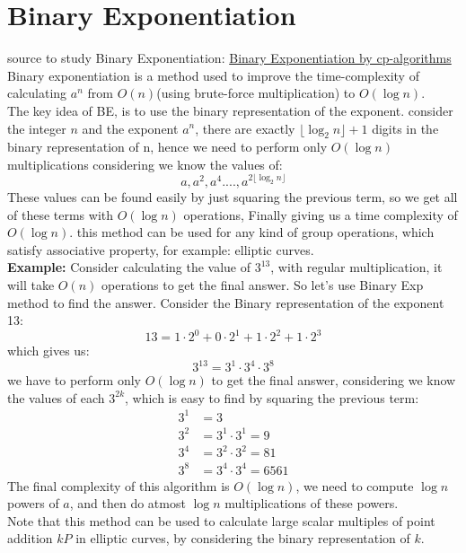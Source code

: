 \documentclass[12pt,a4paper]{report}
\begin{document}
\section{Binary Exponentiation}
source to study Binary Exponentiation: \href{https://cp-algorithms.com/algebra/binary-exp.html}{Binary Exponentiation by cp-algorithms}
\newline
\newline
Binary exponentiation is a method used to improve the time-complexity of calculating $a^n$ from $O(n)$(using brute-force multiplication) to $O(\log{n})$.\\
The key idea of BE, is to use the binary representation of the exponent.
consider the integer $n$ and the exponent $a^n$, there are exactly $\lfloor\log_2{n}\rfloor+1$ digits in the binary representation of n, hence we need to perform only $O(\log{n})$ multiplications considering we know the values of:
\[
a, a^2, a^4 ...., a^{2\lfloor\log_2{n}\rfloor}
\]
These values can be found easily by just squaring the previous term, so we get all of these terms with $O(\log{n})$ operations, Finally giving us a time complexity of $O(\log{n})$.
this method can be used for any kind of group operations, which satisfy associative property, for example: elliptic curves.\\
\textbf{Example: }Consider calculating the value of $3^{13}$, with regular multiplication, it will take $O(n)$ operations to get the final answer. So let's use Binary Exp method to find the answer. Consider the Binary representation of the exponent 13:
\[
13 = 1 \cdot 2^0 + 0 \cdot 2^1 + 1 \cdot 2^2 + 1 \cdot 2^3
\]
which gives us:
\[
3^{13} = 3^1 \cdot 3^4 \cdot 3^8
\]
we have to perform only $O(\log{n})$ to get the final answer, considering we know the values of each $3^{2k}$, which is easy to find by squaring the previous term:
\begin{align*}
    3^1 &= 3\\
    3^2 &= 3^1 \cdot 3^1 = 9\\
    3^4 &= 3^2 \cdot 3^2 = 81\\
    3^8 &= 3^4 \cdot 3^4 = 6561
\end{align*}
The final complexity of this algorithm is \textbf{$O(\log{n})$}, we need to compute $\log{n}$ powers of $a$, and then do atmost $\log{n}$ multiplications of these powers.\\
Note that this method can be used to calculate large scalar multiples of point addition $kP$ in elliptic curves, by considering the binary representation of $k$.
\end{document}
